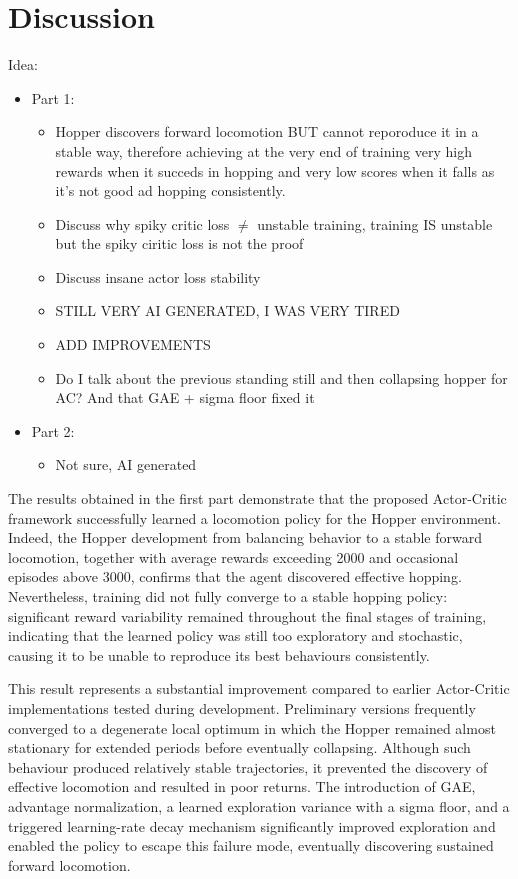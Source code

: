 \section{Discussion}
Idea:
\begin{itemize}
    \item Part 1:
    \begin{itemize}
        \item Hopper discovers forward locomotion BUT cannot reporoduce it in a stable way, therefore achieving at the very end of training very high rewards when it succeds in hopping and very low scores when it falls as it's not good ad hopping consistently.
        \item Discuss why spiky critic loss $\neq$ unstable training, training IS unstable but the spiky ciritic loss is not the proof
        \item Discuss insane actor loss stability
        \item STILL VERY AI GENERATED, I WAS VERY TIRED
        \item ADD IMPROVEMENTS
        \item Do I talk about the previous standing still and then collapsing hopper for AC? And that GAE + sigma floor fixed it
    \end{itemize}

    \item Part 2:
    \begin{itemize}
        \item Not sure, AI generated
    \end{itemize}
\end{itemize}

The results obtained in the first part demonstrate that the proposed Actor-Critic framework successfully learned a locomotion policy for the Hopper environment. Indeed, the Hopper development from balancing behavior to a stable forward locomotion, together with average rewards exceeding 2000 and occasional episodes above 3000, confirms that the agent discovered effective hopping. Nevertheless, training did not fully converge to a stable hopping policy: significant reward variability remained throughout the final stages of training, indicating that the learned policy was still too exploratory and stochastic, causing it to be unable to reproduce its best behaviours consistently.

This result represents a substantial improvement compared to earlier Actor-Critic implementations tested during development. Preliminary versions frequently converged to a degenerate local optimum in which the Hopper remained almost stationary for extended periods before eventually collapsing. Although such behaviour produced relatively stable trajectories, it prevented the discovery of effective locomotion and resulted in poor returns. The introduction of GAE, advantage normalization, a learned exploration variance with a sigma floor, and a triggered learning-rate decay mechanism significantly improved exploration and enabled the policy to escape this failure mode, eventually discovering sustained forward locomotion.

